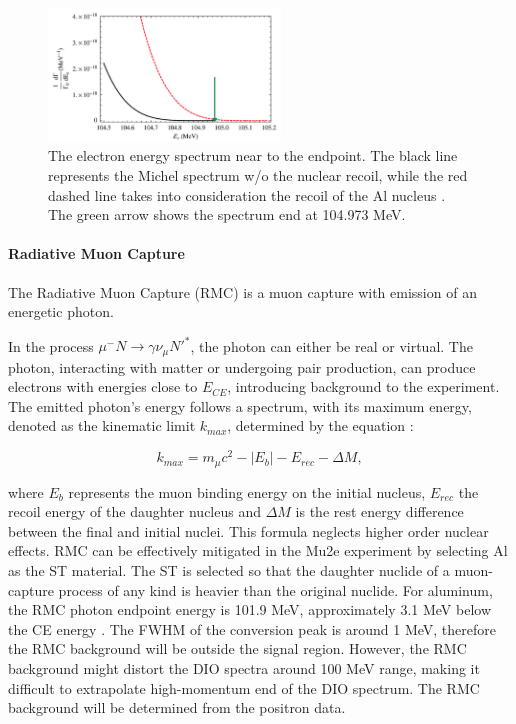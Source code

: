 \begin{figure}[!h]
\centering
\includegraphics[width =0.55\textwidth]{figures/png/Screenshot_20240909_141143.png}
\caption[The electron energy spectrum near to the endpoint.]{The electron energy spectrum near to the endpoint. The black line 
represents the Michel spectrum w/o the nuclear recoil, while the red 
dashed line takes into consideration the recoil of the Al nucleus 
\cite{PhysRevD.84.013006}. The green arrow shows the spectrum end at 104.973 MeV.
}
\label{fig:micheldiff}
\end{figure}


\paragraph{Radiative Muon Capture}
The Radiative Muon Capture (RMC) is a muon capture with emission of an energetic photon.

In the process $\mu^- N \rightarrow\gamma \nu_\mu N'^* $, 
the photon can either be real or virtual. The photon, interacting with matter or 
undergoing pair production, can produce electrons with energies close to $E_{CE}$, 
introducing background to the experiment. The emitted photon's energy follows 
a spectrum, with its maximum energy, denoted as the kinematic limit $k_{max}$, 
determined by the equation \cite{bartoszek2015mu2e}:

\begin{equation}
k_{max} = m_\mu c^2 - |E_b| - E_{rec} - \Delta M ,
\end{equation}

where $E_b$ represents the muon binding energy on the initial nucleus, $E_{rec}$  
the recoil energy of the daughter nucleus and $\Delta M$ is the rest energy difference 
between the final and initial nuclei. This formula neglects higher order nuclear effects. 
RMC can be effectively mitigated in the Mu2e experiment by 
selecting Al as the ST material. The ST is selected so that the daughter nuclide of a muon-capture 
process of any kind is heavier than the original nuclide. For aluminum, the RMC photon 
endpoint energy is 101.9 MeV, approximately 3.1 MeV below the CE energy 
\cite{bartoszek2015mu2e}. 
The FWHM of the conversion peak is around 1 MeV, therefore the RMC background will be 
outside the signal region. However, the RMC background might distort the DIO spectra 
around 100 MeV 
range, making it difficult to extrapolate high-momentum end of the DIO spectrum. 
The RMC background will be determined from the positron data.


